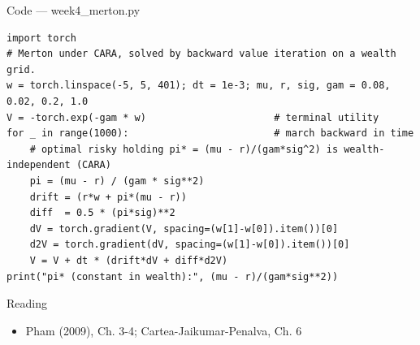 \documentclass[aspectratio=169,10pt]{beamer}
\begin{document}
\begin{frame}[fragile]{Code --- week4\_merton.py}
\begin{lstlisting}
import torch
# Merton under CARA, solved by backward value iteration on a wealth grid.
w = torch.linspace(-5, 5, 401); dt = 1e-3; mu, r, sig, gam = 0.08, 0.02, 0.2, 1.0
V = -torch.exp(-gam * w)                      # terminal utility
for _ in range(1000):                         # march backward in time
    # optimal risky holding pi* = (mu - r)/(gam*sig^2) is wealth-independent (CARA)
    pi = (mu - r) / (gam * sig**2)
    drift = (r*w + pi*(mu - r))
    diff  = 0.5 * (pi*sig)**2
    dV = torch.gradient(V, spacing=(w[1]-w[0]).item())[0]
    d2V = torch.gradient(dV, spacing=(w[1]-w[0]).item())[0]
    V = V + dt * (drift*dV + diff*d2V)
print("pi* (constant in wealth):", (mu - r)/(gam*sig**2))
\end{lstlisting}
\end{frame}
\begin{frame}{Reading}
\begin{itemize}
  \item Pham (2009), Ch. 3-4; Cartea-Jaikumar-Penalva, Ch. 6
\end{itemize}
\end{frame}
\end{document}

